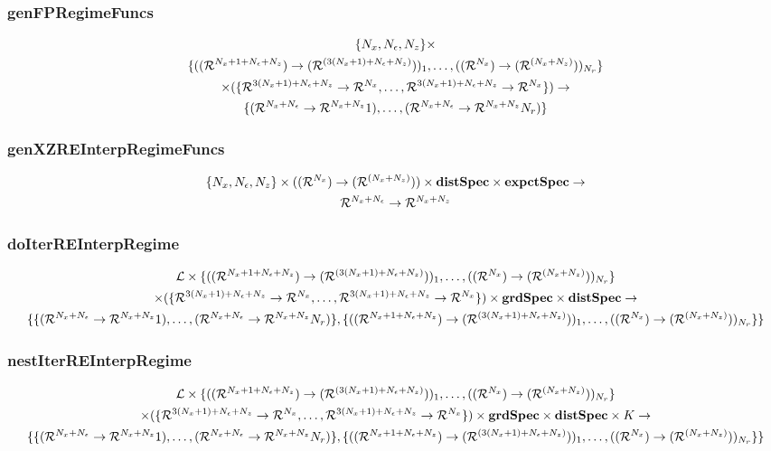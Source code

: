 \documentclass[tikz]{beamer}
\begin{document}
\begin{frame}
\frametitle{genFPRegimeFuncs}
\label{sec:genfpregimefunc}




{\small
\begin{gather*}
\{\numX,\numEps,\numZ\}\times\\
\{(\lilXRegimeFuncSig)_1,\ldots,(\xzFuncGuessSig)_{\numR}\}  \\
 \times (\eqnRegimeFuncSig )\rightarrow\\
\frfpnsRegimeFuncSig
\end{gather*}
}




\end{frame}

\begin{frame}
\frametitle{genXZREInterpRegimeFuncs}
\label{sec:genfpfunc}
\begin{gather*}
\{\numX,\numEps,\numZ\}\times(\xzFuncGuessSig)\times \dstSpec \times  \expctSpec   \rightarrow\\
\frfpnsFuncSig
\end{gather*}



\end{frame}


\begin{frame}
\frametitle{doIterREInterpRegime}
\label{sec:doiterreinterp}

\begin{gather*}
  \linMod \times 
\{(\lilXRegimeFuncSig)_1,\ldots,(\xzFuncGuessSig)_{\numR}\}  \\
 \times (\eqnRegimeFuncSig ) \times \grdSpec \times \dstSpec \rightarrow\\
\{\frfpnsRegimeFuncSig, \{(\lilXRegimeFuncSig)_1,\ldots,(\xzFuncGuessSig)_{\numR}\}\}
\end{gather*}



\end{frame}

\begin{frame}
\frametitle{nestIterREInterpRegime}
\label{sec:nestiterreinterp}



\begin{gather*}
  \linMod \times 
\{(\lilXRegimeFuncSig)_1,\ldots,(\xzFuncGuessSig)_{\numR}\}  \\
 \times (\eqnRegimeFuncSig ) \times \grdSpec \times \dstSpec  \times \numIters \rightarrow\\
\{\frfpnsRegimeFuncSig, \{(\lilXRegimeFuncSig)_1,\ldots,(\xzFuncGuessSig)_{\numR}\}\}
\end{gather*}


\end{frame}
\end{document}
